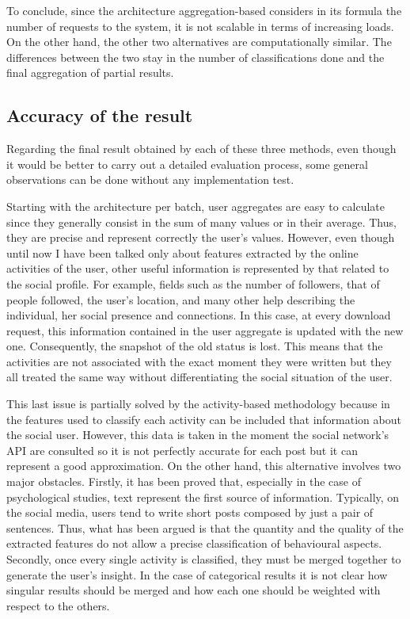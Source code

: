 To conclude, since the architecture aggregation-based considers in its formula the number of requests to the system, it is not scalable in terms of increasing loads.
On the other hand, the other two alternatives are computationally similar. The differences between the two stay in the number of classifications done and the final aggregation of partial results.

\subsection{Accuracy of the result}
Regarding the final result obtained by each of these three methods, even though it would be better to carry out a detailed evaluation process, some general observations can be done without any implementation test.

Starting with the architecture per batch, user aggregates are easy to calculate since they generally consist in the sum of many values or in their average. Thus, they are precise and represent correctly the user's values.
However, even though until now I have been talked only about features extracted by the online activities of the user, other useful information is represented by that related to the social profile. For example, fields such as the number of followers, that of people followed, the user's location, and many other help describing the individual, her social presence and connections.
In this case, at every download request, this information contained in the user aggregate is updated with the new one. Consequently, the snapshot of the old status is lost.
This means that the activities are not associated with the exact moment they were written but they all treated the same way without differentiating the social situation of the user.

This last issue is partially solved by the activity-based methodology because in the features used to classify each activity can be included that information about the social user.
However, this data is taken in the moment the social network's API are consulted so it is not perfectly accurate for each post but it can represent a good approximation.
On the other hand, this alternative involves two major obstacles. Firstly, it has been proved that, especially in the case of psychological studies, text represent the first source of information. Typically, on the social media, users tend to write short posts composed by just a pair of sentences. 
Thus, what has been argued is that the quantity and the quality of the extracted features do not allow a precise classification of behavioural aspects.
Secondly, once every single activity is classified, they must be merged together to generate the user's insight.
In the case of categorical results it is not clear how singular results should be merged and how each one should be weighted with respect to the others.

